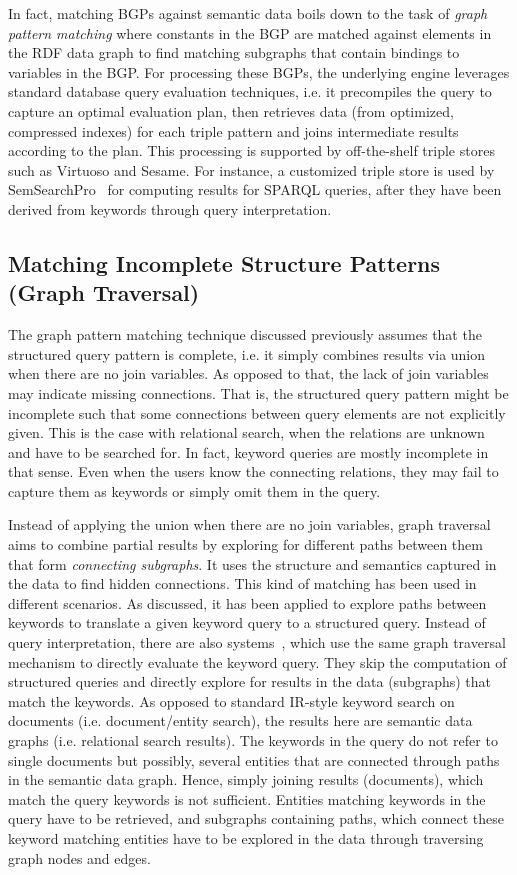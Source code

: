	In fact, matching BGPs against semantic data boils down to the task of \emph{graph pattern matching} where constants in the BGP are matched against elements in the RDF data graph to find matching subgraphs that contain bindings to variables in the BGP. For processing these BGPs, the underlying engine leverages standard database query evaluation techniques, i.e. it precompiles the query to capture an optimal evaluation plan, then retrieves data (from optimized, compressed indexes) for each triple pattern and joins intermediate results according to the plan. This processing is supported by off-the-shelf triple stores such as Virtuoso and Sesame. For instance, a customized triple store is used by SemSearchPro~\cite{DBLP:journals/ws/TranHL11} for computing results for SPARQL queries, after they have been derived from keywords through query interpretation. 
	
	\subsection{Matching Incomplete Structure Patterns (Graph Traversal)} The graph pattern matching technique discussed previously assumes that the structured query pattern is complete, i.e. it simply combines results via union when there are no join variables. As opposed to that, the lack of join variables may indicate missing connections. That is, the structured query pattern might be incomplete such that some connections between query elements are not explicitly given. This is the case with relational search, when the relations are unknown and have to be searched for. In fact, keyword queries are mostly incomplete in that sense. Even when the users know the connecting relations, they may fail to capture them as keywords or simply omit them in the query. 
	
	Instead of applying the union when there are no join variables, graph traversal aims to combine partial results by exploring for different paths between them that form \emph{connecting subgraphs}. It uses the structure and semantics captured in the data to find hidden connections. This kind of matching has been used in different scenarios. As discussed, it has been applied to explore paths between keywords to translate a given keyword query to a structured query. Instead of query interpretation, there are also systems~\cite{DBLP:conf/cikm/LadwigT11,DBLP:conf/sigmod/LiOFWZ08}, which use the same graph traversal mechanism to directly evaluate the keyword query. They skip the computation of structured queries and directly explore for results in the data (subgraphs) that match the keywords. As opposed to standard IR-style keyword search on documents (i.e. document/entity search), the results here are semantic data graphs (i.e. relational search results). The keywords in the query do not refer to single documents but possibly, several entities that are connected through paths in the semantic data graph. Hence, simply joining results (documents), which match the query keywords is not sufficient. Entities matching keywords in the query have to be retrieved, and subgraphs containing paths, which connect these keyword matching entities have to be explored in the data through traversing graph nodes and edges. 
	
